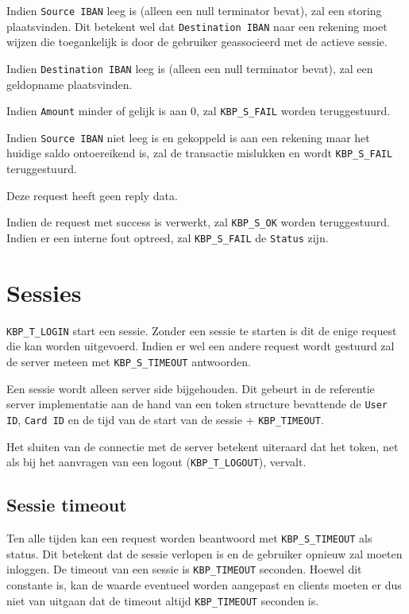 \documentclass[11pt,a4paper]{article}
\begin{document}
Indien \texttt{Source IBAN} leeg is (alleen een null terminator bevat), zal een
storing plaatsvinden. Dit betekent wel dat \texttt{Destination IBAN} naar een
rekening moet wijzen die toegankelijk is door de gebruiker geassocieerd met de
actieve sessie.

Indien \texttt{Destination IBAN} leeg is (alleen een null terminator bevat), zal
een geldopname plaatsvinden.

Indien \texttt{Amount} minder of gelijk is aan 0, zal \texttt{KBP\_S\_FAIL}
worden teruggestuurd.

Indien \texttt{Source IBAN} niet leeg is en gekoppeld is aan een rekening maar
het huidige saldo ontoereikend is, zal de transactie mislukken en wordt
\texttt{KBP\_S\_FAIL} teruggestuurd.

Deze request heeft geen reply data.

Indien de request met success is verwerkt, zal \texttt{KBP\_S\_OK} worden
teruggestuurd. Indien er een interne fout optreed, zal \texttt{KBP\_S\_FAIL} de
\texttt{Status} zijn.


\section{Sessies}
\label{sec:sessies}
\texttt{KBP\_T\_LOGIN} start een sessie. Zonder een sessie te starten is dit de
enige request die kan worden uitgevoerd. Indien er wel een andere request wordt
gestuurd zal de server meteen met \texttt{KBP\_S\_TIMEOUT} antwoorden.

Een sessie wordt alleen server side bijgehouden. Dit gebeurt in de referentie
server implementatie aan de hand van een token structure bevattende de
\texttt{User ID}, \texttt{Card ID} en de tijd van de start van de sessie +
\texttt{KBP\_TIMEOUT}.

Het sluiten van de connectie met de server betekent uiteraard dat het token, net
als bij het aanvragen van een logout (\texttt{KBP\_T\_LOGOUT}), vervalt.

\subsection{Sessie timeout}
Ten alle tijden kan een request worden beantwoord met \texttt{KBP\_S\_TIMEOUT}
als status. Dit betekent dat de sessie verlopen is en de gebruiker opnieuw zal
moeten inloggen. De timeout van een sessie is \texttt{KBP\_TIMEOUT} seconden.
Hoewel dit constante is, kan de waarde eventueel worden aangepast en clients
moeten er dus niet van uitgaan dat de timeout altijd \texttt{KBP\_TIMEOUT}
seconden is.
\end{document}
